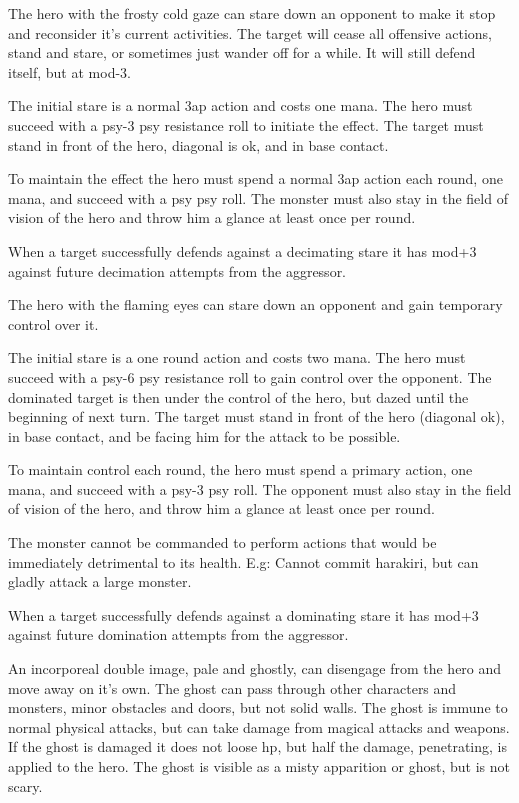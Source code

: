  The hero with the frosty cold gaze can stare down an opponent to make it stop and reconsider it's current activities. The target will cease all offensive actions, stand and stare, or sometimes just wander off for a while. It will still defend itself, but at mod-3.

The initial stare is a normal 3ap action and costs one mana. The hero must succeed with a psy-3 \vs psy resistance roll to initiate the effect. The target must stand in front of the hero, diagonal is ok, and in base contact.

To maintain the effect the hero must spend a normal 3ap action each round, one mana, and succeed with a psy \vs psy roll. The monster must also stay in the field of vision of the hero and throw him a glance at least once per round.

When a target successfully defends against a decimating stare it has mod+3 against future decimation attempts from the aggressor.


 The hero with the flaming eyes can stare down an opponent and gain temporary control over it.

The initial stare is a one round action and costs two mana. The hero must succeed with a psy-6 \vs psy resistance roll to gain control over the opponent. The dominated target is then under the control of the hero, but dazed until the beginning of next turn. The target must stand in front of the hero (diagonal ok), in base contact, and be facing him for the attack to be possible.

To maintain control each round, the hero must spend a primary action, one mana, and succeed with a psy-3 \vs psy roll. The opponent must also stay in the field of vision of the hero, and throw him a glance at least once per round.

The monster cannot be commanded to perform actions that would be immediately detrimental to its health. E.g: Cannot commit harakiri, but can gladly attack a large monster.

When a target successfully defends against a dominating stare it has mod+3 against future domination attempts from the aggressor.


 An incorporeal double image, pale and ghostly, can disengage from the hero and move away on it's own. The ghost can pass through other characters and monsters, minor obstacles and doors, but not solid walls. The ghost is immune to normal physical attacks, but can take damage from magical attacks and weapons. If the ghost is damaged it does not loose hp, but half the damage, penetrating, is applied to the hero. The ghost is visible as a misty apparition or ghost, but is not scary.

